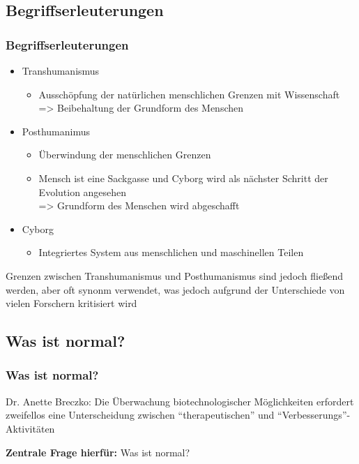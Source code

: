 \documentclass[aspectratio=169,16pt,xcolor=table]{beamer}
\begin{document}
\subsection{Begriffserleuterungen}
\begin{frame}
	\frametitle{Begriffserleuterungen}
	\begin{itemize}
	  \item Transhumanismus
    \begin{itemize}
      \item Ausschöpfung der natürlichen menschlichen Grenzen mit Wissenschaft~\cite{Merzlyakov2022}\\
      => Beibehaltung der Grundform des Menschen
    \end{itemize}
	\item Posthumanimus
    \begin{itemize}
      \item Überwindung der menschlichen Grenzen~\cite{Merzlyakov2022}\\
      \item Mensch ist eine Sackgasse und Cyborg wird als nächster Schritt der Evolution angesehen~\cite{Merzlyakov2022}\\
      => Grundform des Menschen wird abgeschafft
    \end{itemize}
	\item Cyborg
    \begin{itemize}
      \item Integriertes System aus menschlichen und maschinellen Teilen~\cite{warwick2000cyborg}
    \end{itemize}
	\end{itemize}
  \scriptsize Grenzen zwischen Transhumanismus und Posthumanismus sind jedoch fließend werden, aber oft synonm verwendet, was jedoch aufgrund der Unterschiede von vielen Forschern kritisiert wird~\cite{Merzlyakov2022}
\end{frame}

\subsection{Was ist normal?}
\begin{frame}
  \frametitle{Was ist normal?}
  Dr. Anette Breczko: Die Überwachung biotechnologischer Möglichkeiten erfordert zweifellos eine Unterscheidung zwischen ``therapeutischen'' und ``Verbesserungs''-Aktivitäten~\cite{breczko2021human}
  
  \vspace{12pt}
  \textbf{Zentrale Frage hierfür:} Was ist normal? 
\end{frame}
\end{document}
